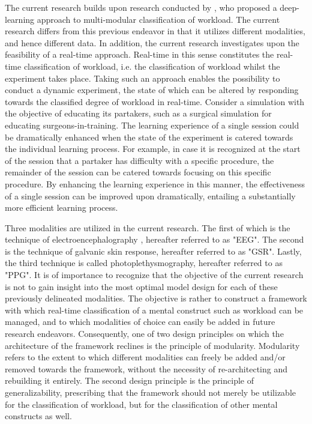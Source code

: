 \documentclass[12pt]{article}
\begin{document}
The current research builds upon research conducted by , who proposed a deep-learning approach to multi-modular classification of workload. The current research differs from this previous endeavor in that it utilizes different modalities, and hence different data. In addition, the current research investigates upon the feasibility of a real-time approach. Real-time in this sense constitutes the real-time classification of workload, i.e. the classification of workload whilst the experiment takes place. Taking such an approach enables the possibility to conduct a dynamic experiment, the state of which can be altered by responding towards the classified degree of workload in real-time. Consider a simulation with the objective of educating its partakers, such as a surgical simulation for educating surgeons-in-training. The learning experience of a single session could be dramatically enhanced when the state of the experiment is catered towards the individual learning process. For example, in case it is recognized at the start of the session that a partaker has difficulty with a specific procedure, the remainder of the session can be catered towards focusing on this specific procedure. By enhancing the learning experience in this manner, the effectiveness of a single session can be improved upon dramatically, entailing a substantially more efficient learning process.

Three modalities are utilized in the current research. The first of which is the technique of electroencephalography
, hereafter referred to as "EEG". The second is the technique of galvanic skin response, hereafter referred to as "GSR". Lastly, the third technique is called photoplethysmography, hereafter referred to as "PPG". It is of importance to recognize that the objective of the current research is not to gain insight into the most optimal model design for each of these previously delineated modalities. The objective is rather to construct a framework with which real-time classification of a mental construct such as workload can be managed, and to which modalities of choice can easily be added in future research endeavors. Consequently, one of two design principles on which the architecture of the framework reclines is the principle of modularity. Modularity refers to the extent to which different modalities can freely be added and/or removed towards the framework, without the necessity of re-architecting and rebuilding it entirely. The second design principle is the principle of generalizability, prescribing that the framework should not merely be utilizable for the classification of workload, but for the classification of other mental constructs as well. 
\end{document}
